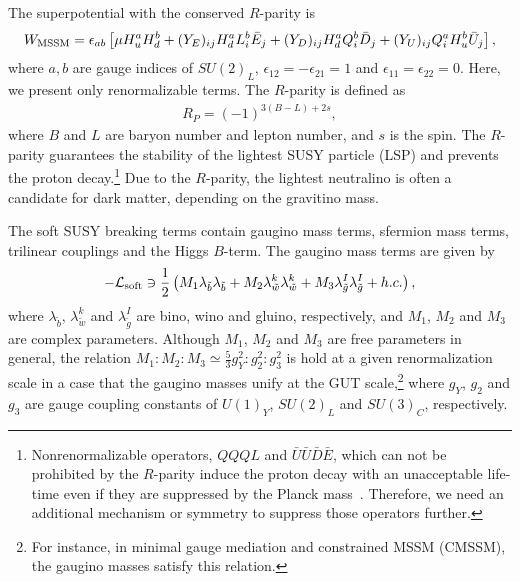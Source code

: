\documentclass[preprint,3p,12pt]{elsarticle}
\begin{document}
\vspace{10pt}
The superpotential  with the conserved $R$-parity is 
\begin{eqnarray}
W_{\rm MSSM} = \epsilon_{ab} \left[ \mu H_u^a H_d^b +  (Y_E)_{ij} H_d^a L^b_i \bar E_j
+  (Y_D)_{ij} H_d^a Q^b_i \bar D_j
+  (Y_U)_{ij} Q^a_i H_u^b \bar U_j
\right],
\end{eqnarray}
where $a,b$ are gauge indices of $SU(2)_L$, $\epsilon_{12}=-\epsilon_{21}=1$ and $\epsilon_{11}=\epsilon_{22}=0$. Here, we present only renormalizable terms. The $R$-parity is defined as
\begin{eqnarray}
R_P = (-1)^{3(B-L)+2 s},  
\end{eqnarray}
where $B$ and $L$ are baryon number and lepton number, and $s$ is the spin.
The $R$-parity guarantees the stability of the lightest SUSY particle (LSP) and prevents the proton decay.\footnote{
%
Nonrenormalizable operators, $QQQL$ and $\bar U \bar U \bar D\bar E$, which can not be prohibited by the $R$-parity induce the proton decay with an unacceptable life-time even if they are suppressed by the Planck mass~\cite{Murayama:1994tc,Harnik:2004yp}. Therefore, we need an additional mechanism or symmetry to suppress those operators further. 
%
}
Due to the $R$-parity, the lightest neutralino is often a candidate for dark matter, depending on the gravitino mass. %

The soft SUSY breaking terms contain gaugino mass terms, sfermion mass terms, 
trilinear couplings and the Higgs $B$-term. 
The gaugino mass terms are given by
\begin{eqnarray}
\label{eq:Lsoft_gaugino}
-\mathcal{L}_{\rm soft} \ni  \frac{1}{2} 
\left( M_{1} \lambda_{\tilde b} \lambda_{\tilde b} +  M_{2} \lambda_{\tilde w}^k \lambda_{\tilde w}^k 
+ M_{3} \lambda_{\tilde g}^I \lambda_{\tilde g}^I + h.c. \right),
\end{eqnarray}
where $\lambda_{\tilde b}$, $\lambda_{\tilde w}^k$ and $\lambda_{\tilde g}^I$ are bino, wino and gluino, respectively, and $M_1$, $M_2$ and $M_3$ are complex parameters. Although $M_1$, $M_2$ and $M_3$ are free parameters in general,
the relation $M_1: M_2: M_3 \simeq \frac{5}{3} g_Y^2: g_2^2: g_3^2$ is hold at a given renormalization scale in a case that the gaugino masses unify at the GUT scale,\footnote{
For instance, in minimal gauge mediation and constrained MSSM (CMSSM), the gaugino masses satisfy this relation.
}
where $g_Y$, $g_2$ and $g_3$ are gauge coupling constants of $U(1)_Y$, $SU(2)_L$ and $SU(3)_C$, respectively. 
\end{document}
